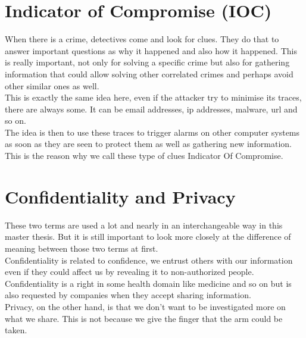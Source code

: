 \documentclass{eplmastersthesis}
\begin{document}
\section{Indicator of Compromise (IOC)}
When there is a crime, detectives come and look for clues. They do that to answer important questions as why it happened and also how it happened. This is really important, not only for solving a specific crime but also for gathering information that could allow solving other correlated crimes and perhaps avoid other similar ones as well.\\
This is exactly the same idea here, even if the attacker try to minimise its traces, there are always some. It can be email addresses, \gls{ip} addresses, malware, \gls{url} and so on.\\
The idea is then to use these traces to trigger alarms on other computer systems as soon as they are seen to protect them as well as gathering new information. This is the reason why we call these type of clues Indicator Of Compromise.

\section{Confidentiality and Privacy}
These two terms are used a lot and nearly in an interchangeable way in this master thesis. But it is still important to look more closely at the difference of meaning between those two terms at first.\\

Confidentiality is related to confidence, we entrust others with our information even if they could affect us by revealing it to non-authorized people. Confidentiality is a right in some health domain like medicine and so on but is also requested by companies when they accept sharing information.\\

Privacy, on the other hand, is that we don't want to be investigated more on what we share. This is not because we give the finger that the arm could be taken.
\end{document}
